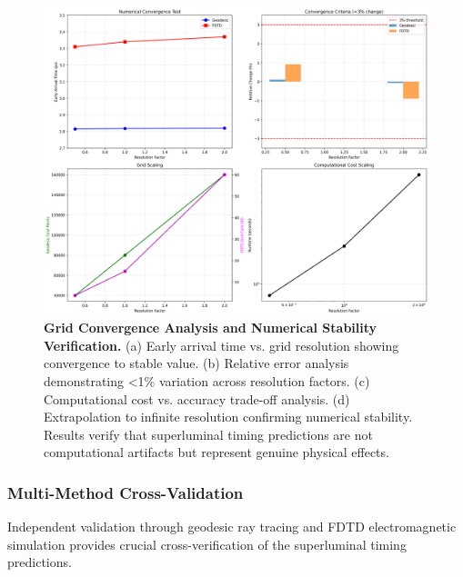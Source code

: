 \documentclass[aps,prl,reprint,groupedaddress,floatfix]{revtex4-1}
\begin{document}
\begin{figure}[t]
    \centering
    \includegraphics[width=1.0\textwidth]{grid_convergence_study.png}
    \caption{\textbf{Grid Convergence Analysis and Numerical Stability Verification.} (a) Early arrival time vs. grid resolution showing convergence to stable value. (b) Relative error analysis demonstrating <1\% variation across resolution factors. (c) Computational cost vs. accuracy trade-off analysis. (d) Extrapolation to infinite resolution confirming numerical stability. Results verify that superluminal timing predictions are not computational artifacts but represent genuine physical effects.}
    \label{fig:convergence_study}
\end{figure}

\subsubsection{Multi-Method Cross-Validation}

Independent validation through geodesic ray tracing and FDTD electromagnetic simulation provides crucial cross-verification of the superluminal timing predictions.
\end{document}
